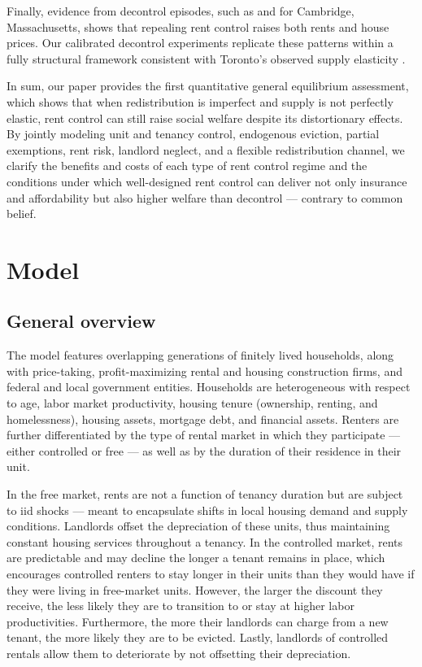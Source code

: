 \documentclass[parskip=full]{article}
\begin{document}
Finally, evidence from decontrol episodes, such as \citet{sims-2007} and \citet{app-2014} for Cambridge, Massachusetts, shows that repealing rent control raises both rents and house prices. Our calibrated decontrol experiments replicate these patterns within a fully structural framework consistent with Toronto’s observed supply elasticity \citep{piaxao-2021, rs-2023}.

In sum, our paper provides the first quantitative general equilibrium assessment, which shows that when redistribution is imperfect and supply is not perfectly elastic, rent control can still raise social welfare despite its distortionary effects. By jointly modeling unit and tenancy control, endogenous eviction, partial exemptions, rent risk, landlord neglect, and a flexible redistribution channel, we clarify the benefits and costs of each type of rent control regime and the conditions under which well-designed rent control can deliver not only insurance and affordability but also higher welfare than decontrol — contrary to common belief. 

\section{Model}\label{sec:model}

\subsection{General overview}\label{sec:brief_overview}

The model features overlapping generations of finitely lived households, along with price-taking, profit-maximizing rental and housing construction firms, and federal and local government entities. Households are heterogeneous with respect to age, labor market productivity, housing tenure (ownership, renting, and homelessness), housing assets, mortgage debt, and financial assets. Renters are further differentiated by the type of rental market in which they participate — either controlled or free — as well as by the duration of their residence in their unit. 

In the free market, rents are not a function of tenancy duration but are subject to iid shocks — meant to encapsulate shifts in local housing demand and supply conditions. Landlords offset the depreciation of these units, thus maintaining constant housing services throughout a tenancy. In the controlled market, rents are predictable and may decline the longer a tenant remains in place, which encourages controlled renters to stay longer in their units than they would have if they were living in free-market units. However, the larger the discount they receive, the less likely they are to transition to or stay at higher labor productivities. Furthermore, the more their landlords can charge from a new tenant, the more likely they are to be evicted. Lastly, landlords of controlled rentals allow them to deteriorate by not offsetting their depreciation. 
\end{document}
